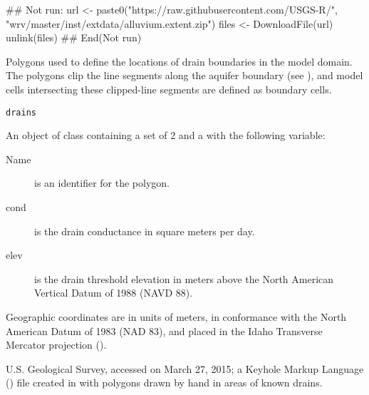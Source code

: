 \documentclass[letterpaper]{book}
\begin{document}
%
\begin{Examples}
\begin{ExampleCode}
## Not run: 
url <- paste0("https://raw.githubusercontent.com/USGS-R/",
              "wrv/master/inst/extdata/alluvium.extent.zip")
files <- DownloadFile(url)
unlink(files)
## End(Not run)
\end{ExampleCode}
\end{Examples}
%
\begin{Description}\relax
Polygons used to define the locations of drain boundaries in the model domain.
The polygons clip the line segments along the aquifer boundary (see ), and model cells intersecting these clipped-line segments are defined as boundary cells.
\end{Description}
%
\begin{Usage}
\begin{verbatim}
drains
\end{verbatim}
\end{Usage}
%
\begin{Format}
An object of  class containing a set of 2  and a  with the following variable:
\begin{description}

\item[Name] is an identifier for the polygon.
\item[cond] is the drain conductance in square meters per day.
\item[elev] is the drain threshold elevation in meters above the North American Vertical Datum of 1988 (NAVD 88).

\end{description}

Geographic coordinates are in units of meters, in conformance with the North American Datum of 1983 (NAD 83), and placed in the
Idaho Transverse Mercator projection ().
\end{Format}
%
\begin{Source}\relax
U.S. Geological Survey, accessed on March 27, 2015;
a Keyhole Markup Language () file created in  with polygons drawn by hand in areas of known drains.
\end{Source}
\end{document}
